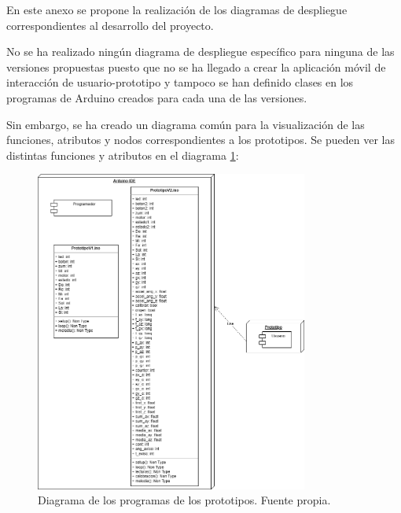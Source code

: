 En este anexo se propone la realización de los diagramas de despliegue correspondientes al desarrollo del proyecto.

No se ha realizado ningún diagrama de despliegue específico para ninguna de las versiones propuestas puesto que no se ha llegado a crear la aplicación móvil de interacción de usuario-prototipo y tampoco se han definido clases en los programas de Arduino\cite{ArduinoIDE} creados para cada una de las versiones. 

Sin embargo, se ha creado un diagrama común para la visualización de las funciones, atributos y nodos correspondientes a los prototipos. Se pueden ver las distintas funciones y atributos en el diagrama \ref{fig:digDespliegue}:

\begin{figure}[h]
    \centering
    \includegraphics[width=0.8\textwidth]{img/DiagramDespliegue.png}
    \caption{Diagrama de los programas de los prototipos. Fuente propia.}
    \label{fig:digDespliegue} 
\end{figure}


